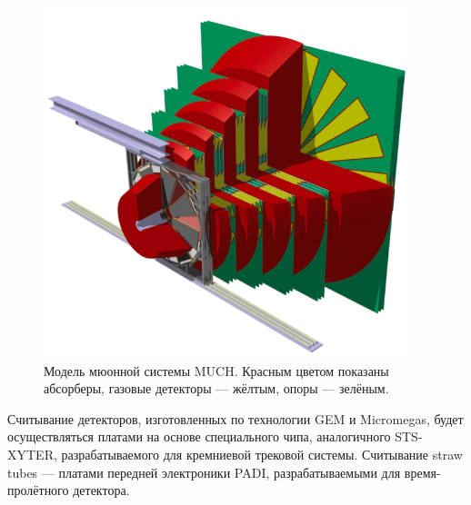 \begin{minipage}[b]{0.495\textwidth}
\begin{figure}[H]
\centering
\includegraphics[width=0.95\textwidth]{pictures/CBM_MUCH_model.png}
\caption{Модель мюонной системы MUCH. Красным цветом показаны абсорберы, газовые детекторы --- жёлтым, опоры --- зелёным.}
\label{fig:MUCH2}
\end{figure}
\end{minipage}



Считывание детекторов, изготовленных по технологии GEM и Micromegas, будет осуществляться платами на основе специального чипа, аналогичного STS-XYTER, разрабатываемого для кремниевой трековой системы. Считывание straw tubes --- платами передней электроники PADI, разрабатываемыми для время-пролётного детектора.

